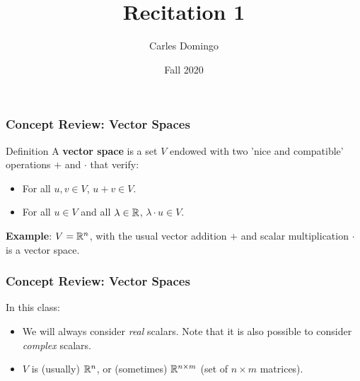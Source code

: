 \documentclass{beamer}
\title{Recitation 1}
\author{Carles Domingo}
\date{Fall 2020}
\begin{document}
\frame{\titlepage} 

\setcounter{showProgressBar}{0}
\setcounter{showSlideNumbers}{1}

\begin{frame}[t]
	\frametitle{Concept Review: Vector Spaces}
	\begin{block}{Definition}
		A \textbf{vector space} is a set $V$ endowed with two 'nice and compatible' operations $+$ and $\cdot$ that verify:
		\begin{itemize}
			\item For all $u,v \in V$, $u+v \in V$.
			\item For all $u \in V$ and all $\lambda \in \mathbb{R}$, $\lambda \cdot u \in V$.
		\end{itemize}
	\end{block}
	\textbf{Example}: $V = \mathbb{R}^n$, with the usual vector addition $+$ and scalar multiplication $\cdot$ is a vector space.
\end{frame}

\begin{frame}
	\frametitle{Concept Review: Vector Spaces}
	In this class:
	\begin{itemize}
		\item We will always consider \emph{real} scalars. Note that it is also possible to consider \emph{complex} scalars.
			\vspace{0.6cm}
		\item $V$ is (usually) $\mathbb{R}^n$, or (sometimes) $\mathbb{R}^{n\times m}$ (set of $n \times m$ matrices).
	\end{itemize}

\end{frame}
\end{document}
